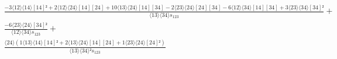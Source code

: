 \documentclass[varwidth, border=5pt]{standalone}
\begin{document}
\begin{my}
$\begin{gathered}
\scriptscriptstyle\frac{-3⟨12⟩⟨14⟩[14]²+2⟨12⟩⟨24⟩[14][24]+10⟨13⟩⟨24⟩[14][34]-2⟨23⟩⟨24⟩[24][34]-6⟨12⟩⟨34⟩[14][34]+3⟨23⟩⟨34⟩[34]²}{⟨13⟩⟨34⟩s_{123}} +\\
\scriptscriptstyle\frac{-6⟨23⟩⟨24⟩[34]²}{⟨12⟩⟨34⟩s_{123}} +\\
\scriptscriptstyle\frac{⟨24⟩(1⟨13⟩⟨14⟩[14]²+2⟨13⟩⟨24⟩[14][24]+1⟨23⟩⟨24⟩[24]²)}{⟨13⟩⟨34⟩²s_{123}} \phantom{+}
\end{gathered}$
\end{my}
\end{document}
